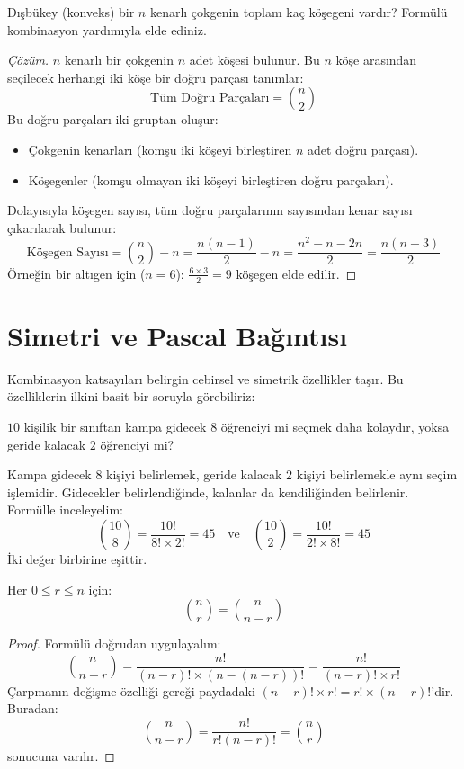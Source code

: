 \begin{example}
Dışbükey (konveks) bir $n$ kenarlı çokgenin toplam kaç köşegeni vardır? Formülü kombinasyon yardımıyla elde ediniz.
\end{example}
\begin{proof}[Çözüm]
$n$ kenarlı bir çokgenin $n$ adet köşesi bulunur. Bu $n$ köşe arasından seçilecek herhangi iki köşe bir doğru parçası tanımlar:
\[ \text{Tüm Doğru Parçaları} = \binom{n}{2} \]
Bu doğru parçaları iki gruptan oluşur:
\begin{itemize}
  \item Çokgenin kenarları (komşu iki köşeyi birleştiren $n$ adet doğru parçası).
  \item Köşegenler (komşu olmayan iki köşeyi birleştiren doğru parçaları).
\end{itemize}
Dolayısıyla köşegen sayısı, tüm doğru parçalarının sayısından kenar sayısı çıkarılarak bulunur:
\[ \text{Köşegen Sayısı} = \binom{n}{2} - n = \frac{n(n - 1)}{2} - n = \frac{n^2 - n - 2n}{2} = \frac{n(n - 3)}{2} \]
Örneğin bir altıgen için ($n = 6$): $\frac{6 \times 3}{2} = 9$ köşegen elde edilir.
\end{proof}


\section{Simetri ve Pascal Bağıntısı}

Kombinasyon katsayıları belirgin cebirsel ve simetrik özellikler taşır. Bu özelliklerin ilkini basit bir soruyla görebiliriz:

$10$ kişilik bir sınıftan kampa gidecek $8$ öğrenciyi mi seçmek daha kolaydır, yoksa geride kalacak $2$ öğrenciyi mi?

Kampa gidecek $8$ kişiyi belirlemek, geride kalacak $2$ kişiyi belirlemekle aynı seçim işlemidir. Gidecekler belirlendiğinde, kalanlar da kendiliğinden belirlenir. Formülle inceleyelim:
\[ \binom{10}{8} = \frac{10!}{8! \times 2!} = 45 \quad \text{ve} \quad \binom{10}{2} = \frac{10!}{2! \times 8!} = 45 \]
İki değer birbirine eşittir.

\begin{theorem}
Her $0 \le r \le n$ için:
\[ \binom{n}{r} = \binom{n}{n - r} \]
\end{theorem}
\begin{proof}
Formülü doğrudan uygulayalım:
\[ \binom{n}{n - r} = \frac{n!}{(n - r)! \times (n - (n - r))!} = \frac{n!}{(n - r)! \times r!} \]
Çarpmanın değişme özelliği gereği paydadaki $(n - r)! \times r! = r! \times (n - r)!$'dir. Buradan:
\[ \binom{n}{n - r} = \frac{n!}{r!(n - r)!} = \binom{n}{r} \]
sonucuna varılır.
\end{proof}

